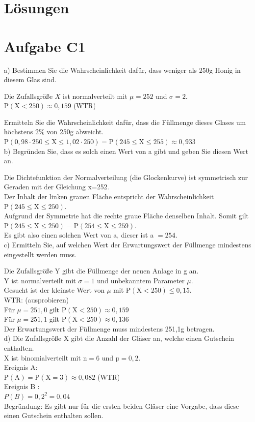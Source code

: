 \documentclass[10pt]{article}
\begin{document}
\section*{Lösungen}
\section*{Aufgabe C1}
a) Bestimmen Sie die Wahrscheinlichkeit dafür, dass weniger als 250g Honig in diesem Glas sind.

Die Zufallsgröße $X$ ist normalverteilt mit $\mu=252$ und $\sigma=2$.\\
$\mathrm{P}(\mathrm{X}<250) \approx 0,159$ (WTR)

Ermitteln Sie die Wahrscheinlichkeit dafür, dass die Füllmenge dieses Glases um höchstens $2 \%$ von 250g abweicht.\\
$\mathrm{P}(0,98 \cdot 250 \leq \mathrm{X} \leq 1,02 \cdot 250)=\mathrm{P}(245 \leq \mathrm{X} \leq 255) \approx 0,933$\\
b) Begründen Sie, dass es solch einen Wert von a gibt und geben Sie diesen Wert an.

Die Dichtefunktion der Normalverteilung (die Glockenkurve) ist symmetrisch zur Geraden mit der Gleichung x=252.\\
Der Inhalt der linken grauen Fläche entspricht der Wahrscheinlichkeit $\mathrm{P}(245 \leq \mathrm{X} \leq 250)$.\\

Aufgrund der Symmetrie hat die rechte graue Fläche denselben Inhalt. Somit gilt $\mathrm{P}(245 \leq \mathrm{X} \leq 250)=\mathrm{P}(254 \leq \mathrm{X} \leq 259)$.\\
Es gibt also einen solchen Wert von a, dieser ist a $=254$.\\
c) Ermitteln Sie, auf welchen Wert der Erwartungswert der Füllmenge mindestens eingestellt werden muss.

Die Zufallsgröße Y gibt die Füllmenge der neuen Anlage in g an.\\
Y ist normalverteilt mit $\sigma=1$ und unbekanntem Parameter $\mu$.\\
Gesucht ist der kleinste Wert von $\mu$ mit $\mathrm{P}(\mathrm{X}<250) \leq 0,15$.\\
WTR: (ausprobieren)\\
Für $\mu=251,0$ gilt $\mathrm{P}(\mathrm{X}<250) \approx 0,159$\\
Für $\mu=251,1$ gilt $\mathrm{P}(\mathrm{X}<250) \approx 0,136$\\
Der Erwartungswert der Füllmenge muss mindestens 251,1g betragen.\\
d) Die Zufallsgröße X gibt die Anzahl der Gläser an, welche einen Gutschein enthalten.\\
X ist binomialverteilt mit $\mathrm{n}=6$ und $\mathrm{p}=0,2$.\\
Ereignis A:\\
$\mathrm{P}(\mathrm{A})=\mathrm{P}(\mathrm{X}=3) \approx 0,082$ (WTR)\\
Ereignis B :\\
$P(B)=0,2^{2}=0,04$\\
Begründung: Es gibt nur für die ersten beiden Gläser eine Vorgabe, dass diese einen Gutschein enthalten sollen.
\end{document}
